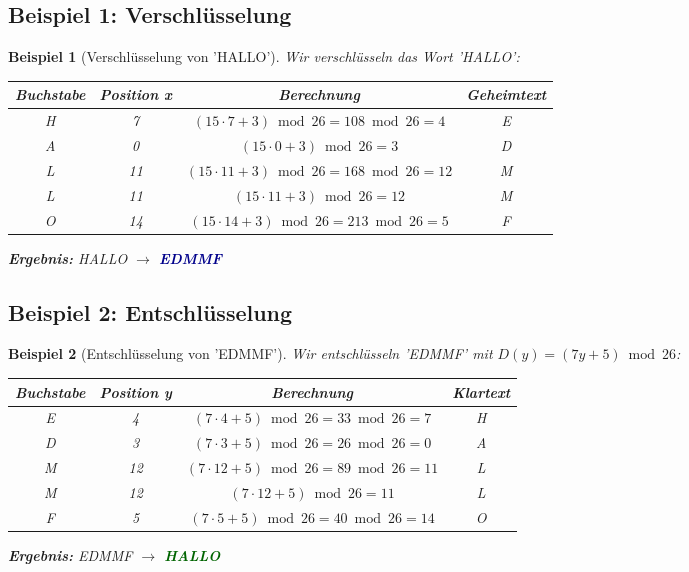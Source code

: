 ﻿\documentclass[12pt,a4paper]{article}
\newtheorem{example}{Beispiel}
\begin{document}
	\subsection{Beispiel 1: Verschlüsselung}
	
	\begin{example}[Verschlüsselung von 'HALLO']
		Wir verschlüsseln das Wort 'HALLO':
		
		\begin{center}
			\small
			\begin{tabular}{c|c|c|c}
				\textbf{Buchstabe} & \textbf{Position x} & \textbf{Berechnung} & \textbf{Geheimtext} \\
				\hline
				H & 7 & $(15 \cdot 7 + 3) \bmod 26 = 108 \bmod 26 = 4$ & E \\
				A & 0 & $(15 \cdot 0 + 3) \bmod 26 = 3$ & D \\
				L & 11 & $(15 \cdot 11 + 3) \bmod 26 = 168 \bmod 26 = 12$ & M \\
				L & 11 & $(15 \cdot 11 + 3) \bmod 26 = 12$ & M \\
				O & 14 & $(15 \cdot 14 + 3) \bmod 26 = 213 \bmod 26 = 5$ & F \\
			\end{tabular}
		\end{center}
		
		\textbf{Ergebnis:} HALLO $\to$ \textcolor{darkblue}{\textbf{EDMMF}}
	\end{example}
	
	\subsection{Beispiel 2: Entschlüsselung}
	
	\begin{example}[Entschlüsselung von 'EDMMF']
		Wir entschlüsseln 'EDMMF' mit $D(y) = (7y + 5) \bmod 26$:
		
		\begin{center}
			\begin{tabular}{c|c|c|c}
				\textbf{Buchstabe} & \textbf{Position y} & \textbf{Berechnung} & \textbf{Klartext} \\
				\hline
				E & 4 & $(7 \cdot 4 + 5) \bmod 26 = 33 \bmod 26 = 7$ & H \\
				D & 3 & $(7 \cdot 3 + 5) \bmod 26 = 26 \bmod 26 = 0$ & A \\
				M & 12 & $(7 \cdot 12 + 5) \bmod 26 = 89 \bmod 26 = 11$ & L \\
				M & 12 & $(7 \cdot 12 + 5) \bmod 26 = 11$ & L \\
				F & 5 & $(7 \cdot 5 + 5) \bmod 26 = 40 \bmod 26 = 14$ & O \\
			\end{tabular}
		\end{center}
		
		\textbf{Ergebnis:} EDMMF $\to$ \textcolor{darkgreen}{\textbf{HALLO}} \checkmark
	\end{example}
	
\end{document}
